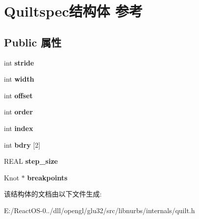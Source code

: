 \hypertarget{struct_quiltspec}{}\section{Quiltspec结构体 参考}
\label{struct_quiltspec}
\subsection*{Public 属性}
\begin{DoxyCompactItemize}
\item 
\mbox{\label{struct_quiltspec_a935b7d7d712e1ffad7eb162037d99000}} 
int {\bfseries stride}
\item 
\mbox{\label{struct_quiltspec_ad51b1ab5360e9581a3b77b65a3ea1ce1}} 
int {\bfseries width}
\item 
\mbox{\label{struct_quiltspec_a948be61d46ea92556ae5edbc966808b9}} 
int {\bfseries offset}
\item 
\mbox{\label{struct_quiltspec_a7a7e292fadd47d4311f2facb47981c97}} 
int {\bfseries order}
\item 
\mbox{\label{struct_quiltspec_a3108be16d967389812fd24870308ca2f}} 
int {\bfseries index}
\item 
\mbox{\label{struct_quiltspec_a4711c6f1f301691766cf44ebf7964c6b}} 
int {\bfseries bdry} \mbox{[}2\mbox{]}
\item 
\mbox{\label{struct_quiltspec_a4eb9d85a78a770f7fb7b9ebeac76977a}} 
R\+E\+AL {\bfseries step\+\_\+size}
\item 
\mbox{\label{struct_quiltspec_a2404e7359221c1d2352e98a6e41f3648}} 
Knot $\ast$ {\bfseries breakpoints}
\end{DoxyCompactItemize}


该结构体的文档由以下文件生成\+:\begin{DoxyCompactItemize}
\item 
E\+:/\+React\+O\+S-\/0../dll/opengl/glu32/src/libnurbs/internals/quilt.\+h\end{DoxyCompactItemize}
